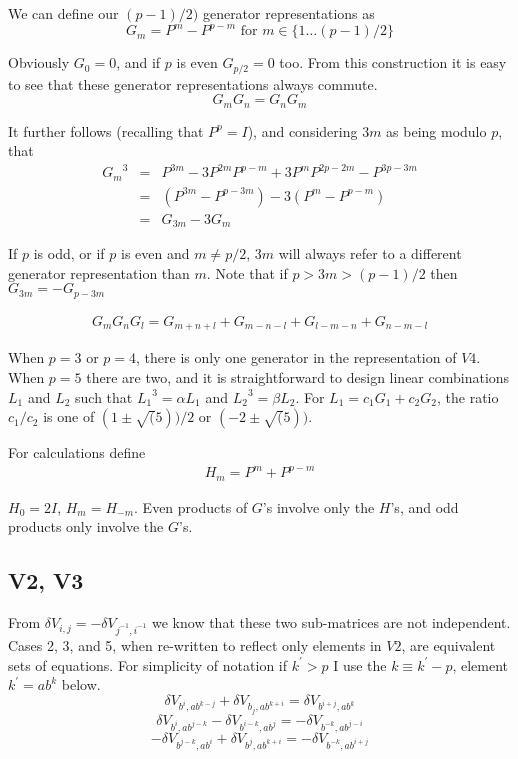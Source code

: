 \documentclass{revtex4-1}
\begin{document}
We can define our $(p-1)/2)$ generator representations as
\begin{equation}
G_m = P^m - P^{p-m} \text{ for } m \in \{1 \dots (p-1)/2\}
\end{equation}

Obviously $G_0 = 0$, and if $p$ is even $G_{p/2}=0$ too.  From this construction it is easy to see that these generator representations always commute.
\begin{equation}
G_m G_n = G_n G_m
\end{equation}

It further follows (recalling that $P^p=I$), and considering $3m$ as being modulo $p$, that
\begin{eqnarray}
{G_m}^3 & =&  P^{3m} - 3 P^{2m} P^{p-m} + 3 P^m P^{2p-2m} - P^{3p-3m} \\
&=& (P^{3m} - P^{p-3m}) - 3 (P^m - P^{p-m}) \\
&=& G_{3m} - 3 G_m
\end{eqnarray}

If $p$ is odd, or if $p$ is even and $m\neq p/2$, $3m$ will always refer to a different generator representation
than $m$.  Note that if $p>3m>(p-1)/2$ then $G_{3m} = -G_{p-3m}$

\begin{eqnarray}
G_m G_n G_l = G_{m+n+l} + G_{m-n-l} + G_{l-m-n} + G_{n-m-l}
\end{eqnarray}

When $p=3$ or $p=4$, there is only one generator in the representation of $V4$.  When
$p=5$ there are two, and it is straightforward to design linear combinations $L_1$ and
$L_2$ such that ${L_1}^3 = \alpha L_1$ and ${L_2}^3 = \beta L_2$.  For $L_1 = c_1 G_1 
+ c_2 G_2$, the ratio  $c_1/c_2$ is one of $(1 \pm \sqrt(5))/2$ or $(-2 \pm \sqrt(5))$.

For calculations define
\begin{eqnarray}
H_m = P^m + P^{p-m}
\end{eqnarray}

\par $H_0 = 2 I$, $H_m=H_{-m}$.  Even products of $G$'s involve  only the $H$'s, and odd products only
involve the $G$'s.

\subsection{V2, V3}
From $\delta V_{i,j} = - \delta V_{j^{-1},i^{-1}}$ we know that these two sub-matrices
are not independent.  Cases 2, 3, and 5, when re-written to reflect only elements in $V2$,
are equivalent sets of equations.  For simplicity of notation if $k^{\prime}>p$ I use the 
$k \equiv k^{\prime} -p$, 
element $k^{\prime} = a b^k$ below.
$$\delta V_{b^i,ab^{k-j}} + \delta V_{b_j,ab^{k+i}} = \delta V_{b^{i+j},ab^k}$$
$$\delta V_{b^i,ab^{j-k}} - \delta V_{b^{i-k},ab^j} = - \delta V_{b^{-k}, ab^{j-i}}$$
$$-\delta V_{b^{j-k},ab^i} + \delta V_{b^j, ab^{k+i}} = -\delta V_{b^{-k},ab^{i+j}}$$
\end{document}
